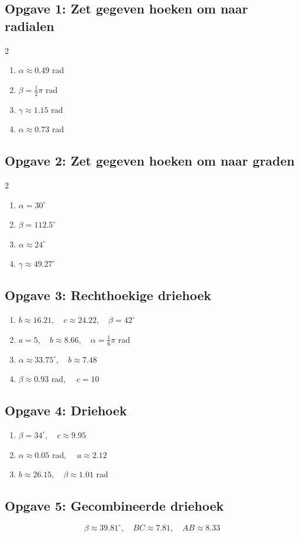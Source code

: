 \subsection*{Opgave 1: Zet gegeven hoeken om naar radialen}
\begin{multicols}{2}
\begin{enumerate}[label=\alph*)]
    \item $\alpha \approx 0.49$ rad
    \item $\beta = \frac{1}{2}\pi$ rad
    \item $\gamma \approx 1.15$ rad
    \item $\alpha \approx 0.73$ rad
\end{enumerate}
\end{multicols}

\subsection*{Opgave 2: Zet gegeven hoeken om naar graden}
\begin{multicols}{2}
\begin{enumerate}[label=\alph*)]
    \item $\alpha = 30^{\circ}$
    \item $\beta = 112.5^{\circ}$
    \item $\alpha \approx 24^{\circ}$
    \item $\gamma \approx 49.27^{\circ}$
\end{enumerate}
\end{multicols}

\subsection*{Opgave 3: Rechthoekige driehoek}
\begin{enumerate}[label=\alph*)]
    \item $b \approx 16.21, \quad c \approx 24.22, \quad \beta = 42^{\circ}$
    \item $a = 5, \quad b \approx 8.66, \quad \alpha = \frac{1}{6}\pi$ rad
    \item $\alpha \approx 33.75^{\circ}, \quad b \approx 7.48$
    \item $\beta \approx 0.93$ rad, $\quad c = 10$
\end{enumerate}

\subsection*{Opgave 4: Driehoek}
\begin{enumerate}[label=\alph*)]
    \item $\beta = 34^{\circ}, \quad c \approx 9.95$
    \item $\alpha \approx 0.05$ rad, $\quad a \approx 2.12$
    \item $b \approx 26.15, \quad \beta \approx 1.01$ rad
\end{enumerate}

\subsection*{Opgave 5: Gecombineerde driehoek}
\[
    \beta \approx 39.81^{\circ}, \quad BC \approx 7.81, \quad AB \approx 8.33
\]
